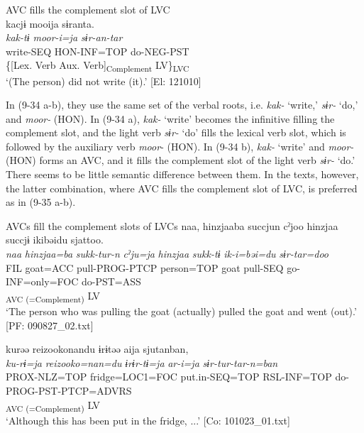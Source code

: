 \ex AVC fills the complement slot of LVC\label{ex:9.34b}\\
 \gllll  kacjɨ  mooija  sɨranta.\\
    \textit{kak{}-tɨ  moor{}-i=ja  sɨr{}-an-tar}\\
    write-SEQ  HON-INF=TOP  do-NEG-PST\\
    \{[Lex. Verb  Aux. Verb]\textsubscript{Complement}  LV\}\textsubscript{LVC}\\
    \glt     ‘(The person) did not write (it).’ [El: 121010]
    \z
\z

In (9-34 a-b), they use the same set of the verbal roots, i.e. \textit{kak-} ‘write,’ \textit{sɨr-} ‘do,’ and \textit{moor-} (HON). In (9-34 a), \textit{kak-} ‘write’ becomes the infinitive filling the complement slot, and the light verb \textit{sɨr-} ‘do’ fills the lexical verb slot, which is followed by the auxiliary verb \textit{moor}{}- (HON). In (9-34 b), \textit{kak-} ‘write’ and \textit{moor-} (HON) forms an AVC, and it fills the complement slot of the light verb \textit{sɨr-} ‘do.’ There seems to be little semantic difference between them. In the texts, however, the latter combination, where AVC fills the complement slot of LVC, is preferred as in (9-35 a-b).

\ea   AVCs fill the complement slots of LVCs \label{ex:9.35}
\ea \label{ex:9.35a}%
 \gllll  naa,  hinzjaaba  succjun  cˀjoo  hinzjaa   succjɨ  ikibəidu  sjattoo.\\
      \textit{naa}  \textit{hinzjaa=ba}  \textit{sukk-tur-n}  \textit{cˀju=ja}  \textit{hinzjaa}  \textit{sukk-tɨ}  \textit{ik-i=bəi=du}  \textit{sɨr{}-tar=doo}\\
      FIL  goat=ACC  pull-PROG-PTCP  person=TOP  goat pull-SEQ  go-INF=only=FOC  do-PST=ASS\\
      [Lex. Verb  Aux. Verb]\textsubscript{AVC (=Complement)}  LV\\
      \glt       ‘The person who was pulling the goat (actually) pulled the goat and went (out).’ [PF: 090827\_02.txt]

\ex \label{ex:9.35b}%
\gllll kurəə  {\textbar}reizooko{\textbar}nandu  ɨrɨtəə  aija   sjutanban,\\
      \textit{ku-rɨ=ja}  \textit{reizooko=nan=du}  \textit{ɨrɨr-tɨ=ja}  \textit{ar-i=ja} \textit{sɨr{}-tur-tar-n=ban}\\
      PROX-NLZ=TOP  fridge=LOC1=FOC  put.in{}-SEQ=TOP  RSL-INF=TOP  do-PROG-PST-PTCP=ADVRS\\
          [Lex. Verb  Aux. Verb]\textsubscript{ AVC (=Complement)}  LV      \\
      \glt       ‘Although this has been put in the fridge, ...’ [Co: 101023\_01.txt]
    \z
\z

